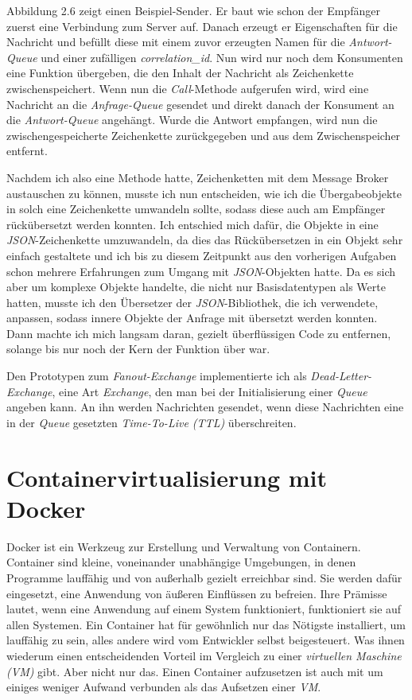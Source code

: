 \documentclass[12pt,a4paper]{scrartcl}
\begin{document}
Abbildung 2.6 zeigt einen Beispiel-Sender. Er baut wie schon der Empfänger zuerst eine Verbindung zum Server auf. Danach erzeugt er Eigenschaften für die Nachricht und befüllt diese mit einem zuvor erzeugten Namen für die \emph{Antwort-Queue} und einer zufälligen \emph{correlation\_id}. Nun wird nur noch dem Konsumenten eine Funktion übergeben, die den Inhalt der Nachricht als Zeichenkette zwischenspeichert. Wenn nun die \emph{Call}-Methode aufgerufen wird, wird eine Nachricht an die \emph{Anfrage-Queue} gesendet und direkt danach der Konsument an die \emph{Antwort-Queue} angehängt. Wurde die Antwort empfangen, wird nun die zwischengespeicherte Zeichenkette zurückgegeben und aus dem Zwischenspeicher entfernt.

Nachdem ich also eine Methode hatte, Zeichenketten mit dem Message Broker austauschen zu können, musste ich nun entscheiden, wie ich die Übergabeobjekte in solch eine Zeichenkette umwandeln sollte, sodass diese auch am Empfänger rückübersetzt werden konnten.
Ich entschied mich dafür, die Objekte in eine \emph{JSON}-Zeichenkette umzuwandeln, da dies das Rückübersetzen in ein Objekt sehr einfach gestaltete und ich bis zu diesem Zeitpunkt aus den vorherigen Aufgaben schon mehrere Erfahrungen zum Umgang mit \emph{JSON}-Objekten hatte. 
Da es sich aber um komplexe Objekte handelte, die nicht nur Basisdatentypen als Werte hatten, musste ich den Übersetzer der \emph{JSON}-Bibliothek, die ich verwendete, anpassen, sodass innere Objekte der Anfrage mit übersetzt werden konnten. 
Dann machte ich mich langsam daran, gezielt überflüssigen Code zu entfernen, solange bis nur noch der Kern der Funktion über war.

Den Prototypen zum \emph{Fanout-Exchange} implementierte ich als \emph{Dead-Letter-Exchange}, eine Art \emph{Exchange}, den man bei der Initialisierung einer \emph{Queue} angeben kann. An ihn werden Nachrichten gesendet, wenn diese Nachrichten eine in der \emph{Queue} gesetzten \emph{Time-To-Live (TTL)} überschreiten.


\newpage
\section{Containervirtualisierung mit Docker} \label{docker}
Docker ist ein Werkzeug zur Erstellung und Verwaltung von Containern. 
Container sind kleine, voneinander unabhängige Umgebungen, in denen Programme lauffähig und von außerhalb gezielt erreichbar sind. Sie werden dafür eingesetzt, eine Anwendung von äußeren Einflüssen zu befreien. Ihre Prämisse lautet, wenn eine Anwendung auf einem System funktioniert, funktioniert sie auf allen Systemen. Ein Container hat für gewöhnlich nur das Nötigste installiert, um lauffähig zu sein, alles andere wird vom Entwickler selbst beigesteuert. Was ihnen wiederum einen entscheidenden Vorteil im Vergleich zu einer \emph{virtuellen Maschine (VM)} gibt. Aber nicht nur das. Einen Container aufzusetzen ist auch mit um einiges weniger Aufwand verbunden als das Aufsetzen einer \emph{VM}. 
\end{document}
